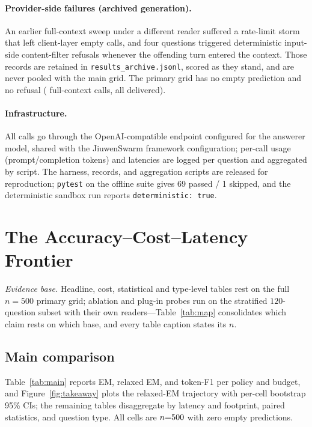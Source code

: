 \documentclass{article} %
\begin{document}
\paragraph{Provider-side failures (archived generation).} An earlier full-context sweep under
a different reader suffered a rate-limit storm that left client-layer empty calls, and four
questions triggered deterministic input-side content-filter refusals whenever the offending
turn entered the context. Those records are retained in \texttt{results\_archive.jsonl},
scored as they stand, and are never pooled with the main grid. The primary grid has no empty
prediction and no refusal (\fcDoneN{} full-context calls, all delivered).

\paragraph{Infrastructure.} All calls go through the OpenAI-compatible endpoint configured
for the answerer model, shared with the JiuwenSwarm framework configuration; per-call
usage (prompt/completion tokens) and latencies are logged per question and aggregated by
script. The harness, records, and aggregation scripts are released for reproduction;
\texttt{pytest} on the offline suite gives 69 passed / 1 skipped, and the deterministic
sandbox run reports \texttt{deterministic: true}.

\section{The Accuracy--Cost--Latency Frontier}
\label{sec:frontier}
\noindent\emph{Evidence base.} Headline, cost, statistical and type-level tables rest on
the full $n{=}500$ primary grid; ablation and plug-in probes run on the stratified
$120$-question subset with their own readers---Table~\ref{tab:map} consolidates which claim
rests on which base, and every table caption states its $n$.
\subsection{Main comparison}
Table~\ref{tab:main} reports EM, relaxed EM, and token-F1 per policy and budget, and
Figure~\ref{fig:takeaway} plots the relaxed-EM trajectory with per-cell bootstrap 95\% CIs;
the remaining tables disaggregate by latency and footprint, paired statistics, and question
type. All cells are $n{=}500{}$ with zero empty predictions.

\begin{table}[h]
\centering\scriptsize
\caption{Main grid (primary reader DeepSeek-V4.1-Flash, full 500-question set): EM,
relaxed EM (EM$_{\text{rel}}$), and token-F1 per cell, reproduced verbatim from the
released records (\texttt{tables500/main.tex}). Twenty-five cells: six families, with the
compression family run in write-time and read-time variants that differ only in how the
digest tier is filled. $^{\dagger}$Full-context has no budget and
is a lossless oracle reference, not a deployable policy. Every cell is an all-question mean
over $n{=}500$ delivered calls; no cell has an empty prediction.}
\label{tab:main}
\setlength{\tabcolsep}{2.5pt}

\end{table}
\end{document}
